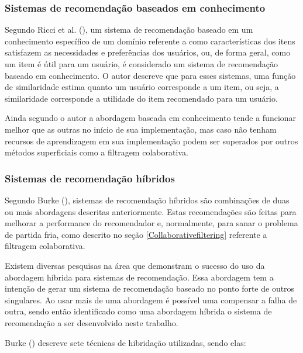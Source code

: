 \subsubsection{Sistemas de recomendação baseados em conhecimento}

Segundo Ricci et al. (\citeyear{Ricci:2010}), um sistema de recomendação baseado em um conhecimento específico de um domínio referente a como características dos itens satisfazem as necessidades e preferências dos usuários, ou, de forma geral, como um item é útil para um usuário, é considerado um sistema de recomendação baseado em conhecimento. O autor descreve que para esses sistemas, uma função de similaridade estima quanto um usuário corresponde a um item, ou seja, a similaridade corresponde a utilidade do item recomendado para um usuário.

Ainda segundo o autor a abordagem baseada em conhecimento tende a funcionar melhor que as outras no início de sua implementação, mas caso não tenham recursos de aprendizagem em sua implementação podem ser superados por outros métodos superficiais como a filtragem colaborativa.

\subsubsection{Sistemas de recomendação híbridos}
\label{Hybrid}

Segundo Burke (\citeyear{Burke:2007}), sistemas de recomendação híbridos são combinações de duas ou mais abordagens descritas anteriormente. Estas recomendações são feitas para melhorar a performance do recomendador e, normalmente, para sanar o problema de partida fria, como descrito no seção \ref{Collaborativefiltering} referente a filtragem colaborativa.

Existem diversas pesquisas na área que demonstram o sucesso do uso da abordagem híbrida para sistemas de recomendação. Essa abordagem tem a intenção de gerar um sistema de recomendação baseado no ponto forte de outros singulares. Ao usar mais de uma abordagem é possível uma compensar a falha de outra, sendo então identificado como uma abordagem híbrida o sistema de recomendação a ser desenvolvido neste trabalho.

Burke (\citeyear{Burke:2007}) descreve sete técnicas de hibridação utilizadas, sendo elas:

